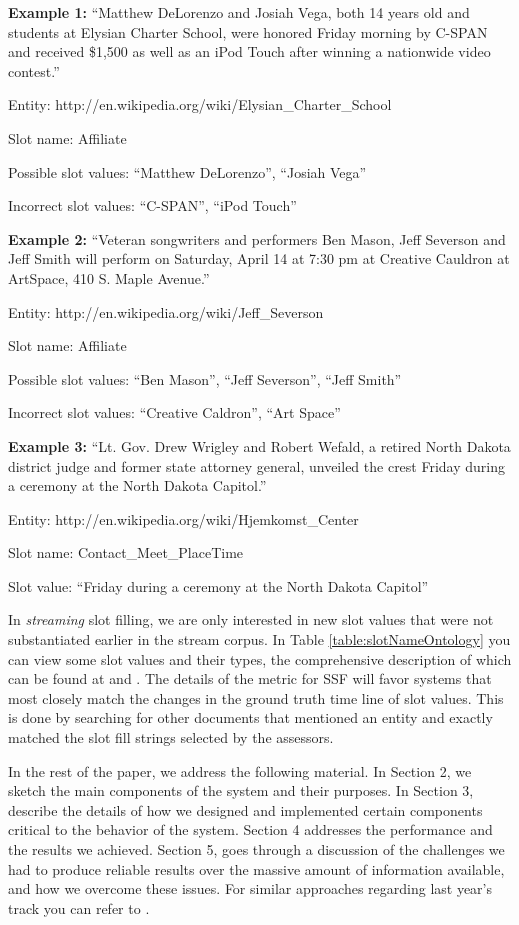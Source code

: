 \noindent \textbf{Example 1:} ``Matthew DeLorenzo and Josiah Vega, both 14 years old and students 
at Elysian Charter School, were honored Friday morning by C-SPAN and received 
\$1,500 as well as an iPod Touch after winning a nationwide video contest.''

Entity:  http://en.wikipedia.org/wiki/Elysian\_Charter\_School

Slot name: Affiliate

Possible slot values: ``Matthew DeLorenzo'', ``Josiah Vega''

Incorrect slot values: ``C-SPAN'', ``iPod Touch''

\noindent \textbf{Example 2:} ``Veteran songwriters and performers Ben Mason, Jeff Severson and 
Jeff Smith will perform on Saturday, April 14 at 7:30 pm at Creative Cauldron 
at ArtSpace, 410 S. Maple Avenue.''

Entity: http://en.wikipedia.org/wiki/Jeff\_Severson

Slot name: Affiliate

Possible slot values: ``Ben Mason'', ``Jeff Severson'', ``Jeff Smith''

Incorrect slot values: ``Creative Caldron'', ``Art Space''

\noindent \textbf{Example 3:}  ``Lt. Gov. Drew Wrigley and Robert Wefald, a retired North Dakota 
district judge and former state attorney general, unveiled the crest Friday 
during a ceremony at the North Dakota Capitol.''

Entity: http://en.wikipedia.org/wiki/Hjemkomst\_Center

Slot name: Contact\_Meet\_PlaceTime

Slot value: ``Friday during a ceremony at the North Dakota Capitol''


\noindent In \textit{streaming} slot filling, we are only interested in new 
slot values that were not substantiated earlier in the stream corpus. In Table \ref{table:slotNameOntology} you can view some slot values 
and their types, the comprehensive description of which can be found at
\cite{tackbp} and \cite{aec}. The details of the metric for SSF will favor systems that most closely match the changes in the ground truth time line of slot values. This is done by searching for other documents that mentioned an entity and exactly matched the slot fill strings selected by the assessors.



In the rest of the paper, we address the following material. In Section 2, we sketch the main components of the system and their purposes. In Section 3, describe the details of how we designed and implemented certain components critical to the behavior of the system. Section 4 addresses the performance and the results we achieved. Section 5, goes through a discussion of the challenges we had to produce reliable results over the massive amount of information available, and how we overcome these issues. For similar approaches regarding last year's track you can refer to \cite{ji2011knowledge}.


